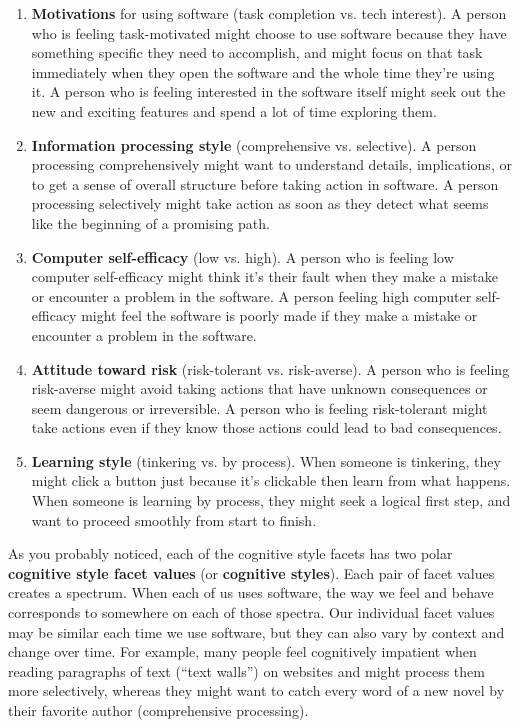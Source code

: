 \begin{enumerate}
\item{\textbf{Motivations} for using software (task completion vs. tech interest). A person who is feeling task-motivated might choose to use software because they have something specific they need to accomplish, and might focus on that task immediately when they open the software and the whole time they're using it. A person who is feeling interested in the software itself might seek out the new and exciting features and spend a lot of time exploring them.}

\item{\textbf{Information processing style} (comprehensive vs. selective). A person processing comprehensively might want to understand details, implications, or to get a sense of overall structure before taking action in software. A person processing selectively might take action as soon as they detect what seems like the beginning of a promising path.}
\item{\textbf{Computer self-efficacy} (low vs. high). A person who is feeling low computer self-efficacy might think it's their fault when they make a mistake or encounter a problem in the software. A person feeling high computer self-efficacy might feel the software is poorly made if they make a mistake or encounter a problem in the software.}
\item{\textbf{Attitude toward risk} (risk-tolerant vs. risk-averse). A person who is feeling risk-averse might avoid taking actions that have unknown consequences or seem dangerous or irreversible. A person who is feeling risk-tolerant might take actions even if they know those actions could lead to bad consequences.}
\item{\textbf{Learning style} (tinkering vs. by process). When someone is tinkering, they might click a button just because it's clickable then learn from what happens. When someone is learning by process, they might seek a logical first step, and want to proceed smoothly from start to finish.}
\end{enumerate}

As you probably noticed, each of the cognitive style facets has two polar \textbf{cognitive style facet values} (or \textbf{cognitive styles}). Each pair of facet values creates a spectrum. When each of us uses software, the way we feel and behave corresponds to somewhere on each of those spectra. Our individual facet values may be similar each time we use software, but they can also vary by context and change over time. For example, many people feel cognitively impatient when reading paragraphs of text (``text walls'') on websites and might process them more selectively, whereas they might want to catch every word of a new novel by their favorite author (comprehensive processing). \marginpar{\attitudeTowardRiskCsfDef\margindivider}\marginpar{\learningStyleCsfDef\margindivider}\marginpar{\cognitiveStyleFacetValueDef\margindivider}\marginpar{\personaDef\margindivider}\marginpar{\cognitiveStylePersonasDef}

